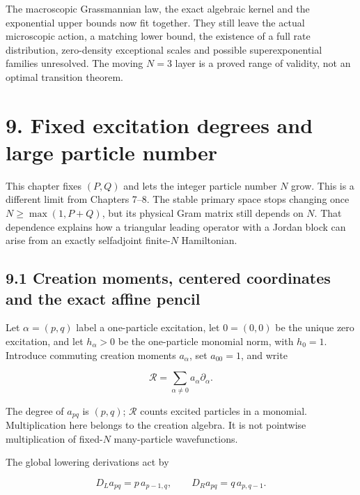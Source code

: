 \documentclass[a4paper,11pt]{article}
\numberwithin{equation}{section}
\begin{document}
The macroscopic Grassmannian law, the exact algebraic kernel and the exponential upper bounds now fit together. They still leave the actual microscopic action, a matching lower bound, the existence of a full rate distribution, zero-density exceptional scales and possible superexponential families unresolved. The moving \(N=3\) layer is a proved range of validity, not an optimal transition theorem.

\clearpage
\hypertarget{fixed-excitation-degrees-and-large-particle-number}{%
\section{9. Fixed excitation degrees and large particle number}\label{fixed-excitation-degrees-and-large-particle-number}}

This chapter fixes \((P,Q)\) and lets the integer particle number \(N\) grow. This is a different limit from Chapters 7--8. The stable primary space stops changing once \(N\geq\max(1,P+Q)\), but its physical Gram matrix still depends on \(N\). That dependence explains how a triangular leading operator with a Jordan block can arise from an exactly selfadjoint finite-\(N\) Hamiltonian.

\hypertarget{creation-moments-centered-coordinates-and-the-exact-affine-pencil}{%
\subsection{9.1 Creation moments, centered coordinates and the exact affine pencil}\label{creation-moments-centered-coordinates-and-the-exact-affine-pencil}}

Let \(\alpha=(p,q)\) label a one-particle excitation, let \(0=(0,0)\) be the unique zero excitation, and let \(h_\alpha>0\) be the one-particle monomial norm, with \(h_0=1\). Introduce commuting creation moments \(a_\alpha\), set \(a_{00}=1\), and write

\[
\mathcal R=\sum_{\alpha\ne0}a_\alpha\partial_\alpha.
\]

The degree of \(a_{pq}\) is \((p,q)\); \(\mathcal R\) counts excited particles in a monomial. Multiplication here belongs to the creation algebra. It is not pointwise multiplication of fixed-\(N\) many-particle wavefunctions.

The global lowering derivations act by

\[
D_La_{pq}=p\,a_{p-1,q},\qquad D_Ra_{pq}=q\,a_{p,q-1}.
\]
\end{document}
